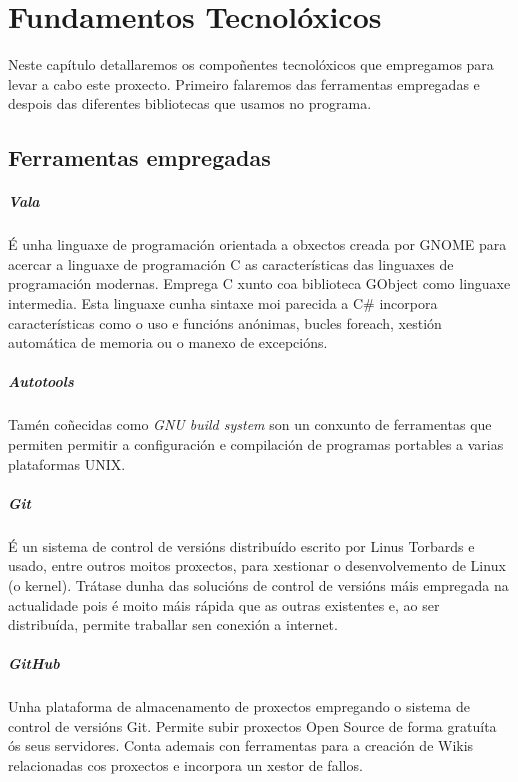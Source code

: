 \chapter{Fundamentos Tecnolóxicos}

Neste capítulo detallaremos os compoñentes tecnolóxicos que empregamos para levar a cabo este proxecto. Primeiro falaremos das ferramentas empregadas e despois das diferentes bibliotecas que usamos no programa.

\section{Ferramentas empregadas}

\paragraph{Vala} É unha linguaxe de programación orientada a obxectos creada por GNOME para acercar a linguaxe de programación C as características das linguaxes de programación modernas. Emprega C xunto coa biblioteca GObject como linguaxe intermedia. Esta linguaxe cunha sintaxe moi parecida a C\# incorpora características como o uso e funcións anónimas, bucles foreach, xestión automática de memoria ou o manexo de excepcións.


 \paragraph{Autotools} Tamén coñecidas como \emph{GNU build system}\cite{manual:automake} son un conxunto de ferramentas que permiten permitir a configuración e compilación de programas portables a varias plataformas UNIX.

 \paragraph{Git} É un sistema de control de versións distribuído escrito por Linus Torbards e usado, entre outros moitos proxectos, para xestionar o desenvolvemento de Linux (o kernel). Trátase dunha das solucións de control de versións máis empregada na actualidade pois é moito máis rápida que as outras existentes e, ao ser distribuída, permite traballar sen conexión a internet.

 \paragraph{GitHub} Unha plataforma de almacenamento de proxectos empregando o sistema de control de versións Git. Permite subir proxectos Open Source de forma gratuíta ós seus servidores. Conta ademais con ferramentas para a creación de Wikis relacionadas cos proxectos e incorpora un xestor de fallos.

